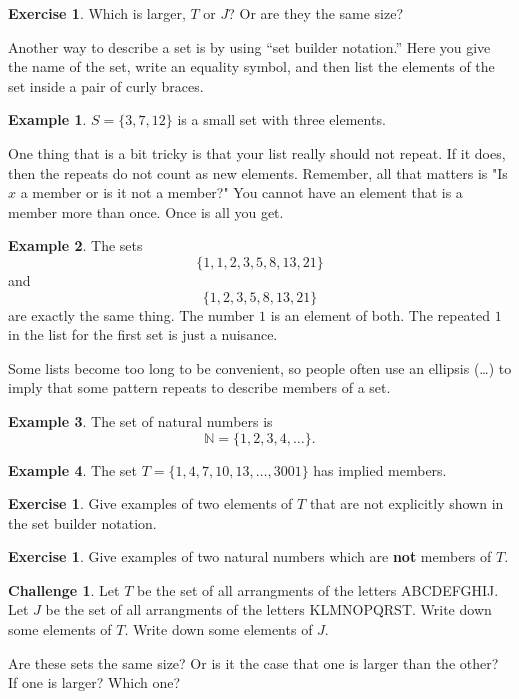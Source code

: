 \documentclass[12pt,letterpaper]{article}
\theoremstyle{definition}
\newtheorem{example}{Example}
\newtheorem{exercise}[question]{Exercise}
\newtheorem*{challenge}{Challenge}
\begin{document}
\begin{exercise}
Which is larger, $T$ or $J$?
Or are they the same size?
\end{exercise}

Another way to describe a set is by using ``set builder notation.''
Here you give the name of the set, write an equality symbol, and then list the elements of the set inside a pair of curly braces.

\begin{example}
$S = \{ 3, 7, 12\}$ is a small set with three elements.
\end{example}

One thing that is a bit tricky is that your list really should not repeat. If it does, then the repeats do not count as new elements. Remember, all that matters is "Is $x$ a member or is it not a member?" You cannot have an element that is a member more than once. Once is all you get.

\begin{example}
The sets
\[
\{1,1,2,3,5,8,13,21\}
\] 
and 
\[ 
\{1,2,3,5,8,13,21\}
\]
are exactly the same thing. The number $1$ is an element of both. The repeated $1$ in the list for the first set is just a nuisance.
\end{example}

Some lists become too long to be convenient, so people often use an ellipsis (\dots) to imply that some pattern repeats to describe members of a set.

\begin{example}
The set of natural numbers is
\[
\mathbb{N} = \{1,2,3,4,\ldots\}.
\]
\end{example}
\begin{example}
The set $T =\{1, 4, 7, 10, 13,\ldots, 3001\}$ has implied members.
\end{example}

\begin{exercise}
Give examples of two elements of $T$ that are not explicitly shown in the set builder notation.
\end{exercise}

\begin{exercise}
Give examples of two natural numbers which are \textbf{not} members of $T$.
\end{exercise}

\begin{challenge}
Let $T$ be the set of all arrangments of the letters ABCDEFGHIJ.
Let $J$ be the set of all arrangments of the letters KLMNOPQRST.
Write down some elements of $T$.
Write down some elements of $J$.

Are these sets the same size?
Or is it the case that one is larger than the other?
If one is larger? 
Which one?
\end{challenge}



\end{document}
